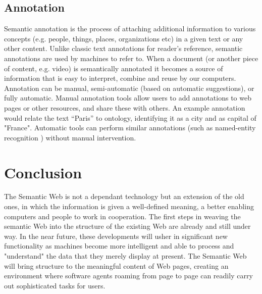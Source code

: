 \subsection{Annotation}
Semantic annotation is the process of attaching additional information to various concepts (e.g. people, things, places, organizations etc) in a given text or any other content. Unlike classic text annotations for reader’s reference, semantic annotations are used by machines to refer to.
When a document (or another piece of content, e.g. video) is semantically annotated it becomes a source of information that is easy to interpret, combine and reuse by our computers. Annotation can be manual, semi-automatic (based on automatic suggestions), or fully automatic. Manual annotation tools allow users to add annotations to web pages or other resources, and share these with others. An example annotation would relate the text “Paris” to ontology, identifying it as a city and as capital of "France". Automatic tools can perform similar annotations (such as named-entity recognition \cite{nlp}) without manual intervention. 

\section*{Conclusion}
The Semantic Web is not a dependant technology but an
extension of the old ones, in which the information is given a well-defined meaning, a better enabling computers and people to work in cooperation. The first steps in weaving the semantic Web into the structure of the existing Web are already and still under way. In the near future, these developments will usher in significant new functionality as machines become more intelligent and able to process and "understand" the data that they merely display at present. The Semantic Web will bring structure to the meaningful content of Web pages, creating an environment where software agents roaming from page to page can readily carry out sophisticated tasks for users. 
